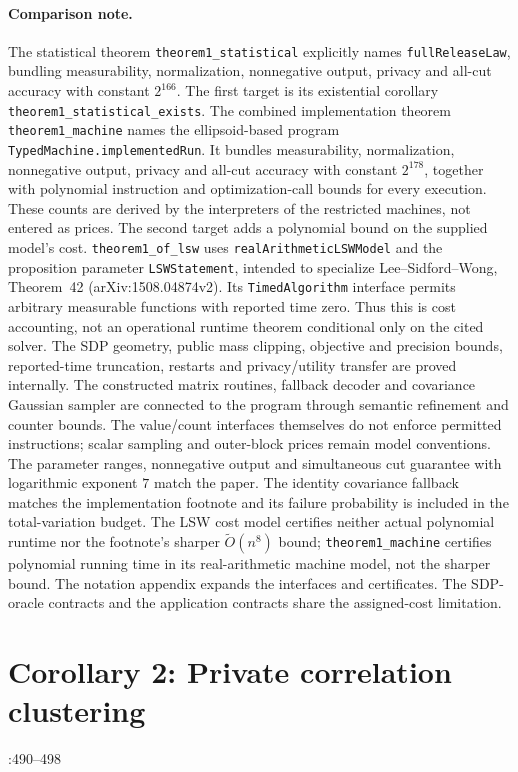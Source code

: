 \documentclass[a4paper,10pt]{article}
\theoremstyle{definition}
\theoremstyle{remark}
\newcommand{\SourceId}[1]{\texttt{\detokenize{#1}}}
\begin{document}
\paragraph{Comparison note.}
The statistical theorem \texttt{theorem1\_statistical} explicitly names \texttt{fullReleaseLaw}, bundling measurability, normalization, nonnegative output, privacy and all-cut accuracy with constant $2^{166}$. The first target is its existential corollary \texttt{theorem1\_statistical\_exists}. The combined implementation theorem \texttt{theorem1\_machine} names the ellipsoid-based program \texttt{TypedMachine.implementedRun}. It bundles measurability, normalization, nonnegative output, privacy and all-cut accuracy with constant $2^{178}$, together with polynomial instruction and optimization-call bounds for every execution. These counts are derived by the interpreters of the restricted machines, not entered as prices. The second target adds a polynomial bound on the supplied model's cost. \texttt{theorem1\_of\_lsw} uses \texttt{realArithmeticLSWModel} and the proposition parameter \texttt{LSWStatement}, intended to specialize Lee--Sidford--Wong, Theorem~42 (arXiv:1508.04874v2). Its \texttt{TimedAlgorithm} interface permits arbitrary measurable functions with reported time zero. Thus this is cost accounting, not an operational runtime theorem conditional only on the cited solver. The SDP geometry, public mass clipping, objective and precision bounds, reported-time truncation, restarts and privacy/utility transfer are proved internally. The constructed matrix routines, fallback decoder and covariance Gaussian sampler are connected to the program through semantic refinement and counter bounds. The value/count interfaces themselves do not enforce permitted instructions; scalar sampling and outer-block prices remain model conventions. The parameter ranges, nonnegative output and simultaneous cut guarantee with logarithmic exponent $7$ match the paper. The identity covariance fallback matches the implementation footnote and its failure probability is included in the total-variation budget. The LSW cost model certifies neither actual polynomial runtime nor the footnote's sharper $\widetilde O(n^8)$ bound; \texttt{theorem1\_machine} certifies polynomial running time in its real-arithmetic machine model, not the sharper bound. The notation appendix expands the interfaces and certificates. The SDP-oracle contracts and the application contracts share the assigned-cost limitation.
\clearpage
\section{Corollary 2: Private correlation clustering}
\SourceId{cor:cc-intro}\hfill\SourceId{STOC2027.tex}:490--498
\end{document}
